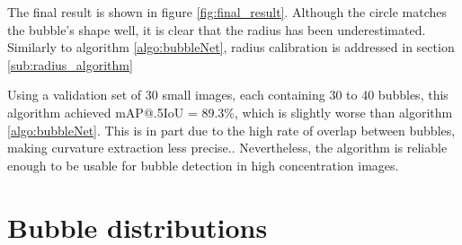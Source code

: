 				The final result is shown in figure \ref{fig:final_result}. Although the circle matches the bubble's shape well, it is clear that the radius has been underestimated. Similarly to algorithm \ref{algo:bubbleNet}, radius calibration is addressed in section \ref{sub:radius_algorithm}
				
				Using a validation set of 30 small images, each containing 30 to 40 bubbles, this algorithm achieved mAP@.5IoU = 89.3\%, which is slightly worse than algorithm \ref{algo:bubbleNet}. This is in part due to the high rate of overlap between bubbles, making curvature extraction less precise.. Nevertheless, the algorithm is reliable enough to be usable for bubble detection in high concentration images.					
				
				\section{Bubble distributions}\label{bubble_distributions}